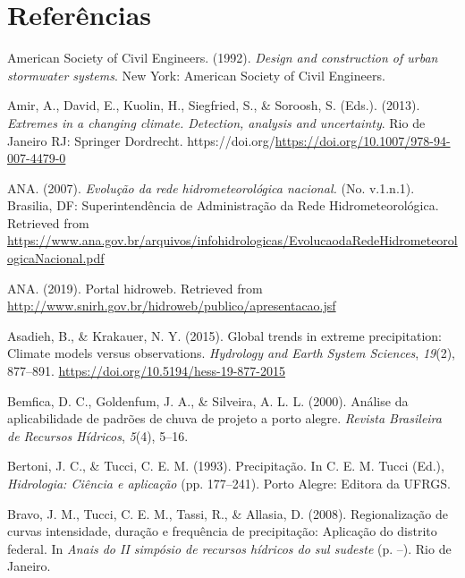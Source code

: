 \documentclass[
]{agujournal2019}
\newlength{\cslhangindent}
\newenvironment{CSLReferences}[2] %
 {\begin{list}{}{%
  \setlength{\itemindent}{0pt}
  \setlength{\leftmargin}{0pt}
  \setlength{\parsep}{0pt}
  \ifodd #1
   \setlength{\leftmargin}{\cslhangindent}
   \setlength{\itemindent}{-1\cslhangindent}
  \fi
  \setlength{\itemsep}{#2\baselineskip}}}
 {\end{list}}
\begin{document}
\section*{Referências}\label{referuxeancias}

\label{refs}
\begin{CSLReferences}{1}{0}
\vspace{1em}

American Society of Civil Engineers. (1992). \emph{Design and
construction of urban stormwater systems}. New York: American Society of
Civil Engineers.

Amir, A., David, E., Kuolin, H., Siegfried, S., \& Soroosh, S. (Eds.).
(2013). \emph{Extremes in a changing climate. Detection, analysis and
uncertainty}. Rio de Janeiro RJ: Springer Dordrecht.
https://doi.org/\url{https://doi.org/10.1007/978-94-007-4479-0}

ANA. (2007). \emph{Evolução da rede hidrometeorológica nacional.} (No.
v.1.n.1). Brasilia, DF: Superintendência de Administração da Rede
Hidrometeorológica. Retrieved from
\url{https://www.ana.gov.br/arquivos/infohidrologicas/EvolucaodaRedeHidrometeorologicaNacional.pdf}

ANA. (2019). Portal hidroweb. Retrieved from
\url{http://www.snirh.gov.br/hidroweb/publico/apresentacao.jsf}

Asadieh, B., \& Krakauer, N. Y. (2015). Global trends in extreme
precipitation: Climate models versus observations. \emph{Hydrology and
Earth System Sciences}, \emph{19}(2), 877--891.
\url{https://doi.org/10.5194/hess-19-877-2015}

Bemfica, D. C., Goldenfum, J. A., \& Silveira, A. L. L. (2000). Análise
da aplicabilidade de padrões de chuva de projeto a porto alegre.
\emph{Revista Brasileira de Recursos Hídricos}, \emph{5}(4), 5--16.

Bertoni, J. C., \& Tucci, C. E. M. (1993). Precipitação. In C. E. M.
Tucci (Ed.), \emph{Hidrologia: Ciência e aplicação} (pp. 177--241).
Porto Alegre: Editora da UFRGS.

Bravo, J. M., Tucci, C. E. M., Tassi, R., \& Allasia, D. (2008).
Regionalização de curvas intensidade, duração e frequência de
precipitação: Aplicação do distrito federal. In \emph{Anais do II
simpósio de recursos hídricos do sul sudeste} (p. --). Rio de Janeiro.


\end{CSLReferences}
\end{document}
